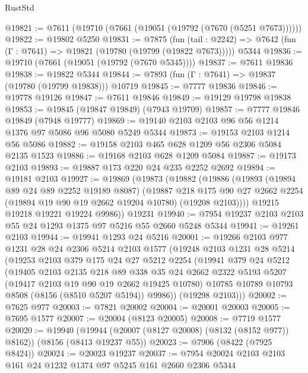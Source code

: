 \begin{lexlean}{RustStd}
\begin{coremodule}
{\begin{coremodule}
{{{{{{{{{{{{{{{{{{{{{{{{{{{{{{{{{{@19821 := @7611 (@19710 (@7661 (@19051 (@19792 (@7670 (@5251 @7673))))))
@19822 := @19802 @5250
@19831 := @7875
    (fun (tail : @2242) => @7642 (fun (Γ : @7641) => @19821 (@19780 (@19799 (@19822 @7673)))))
    @5344
@19836 := @19710 (@7661 (@19051 (@19792 (@7670 @5345))))
@19837 := @7611 @19836
@19838 := @19822 @5344
@19844 := @7893 (fun (Γ : @7641) => @19837 (@19780 (@19799 @19838))) @10719
@19845 := @7777 @19836
@19846 := @19778 @19126
@19847 := @7611 @19846
@19849 := @19129 @19798 @19838
@19853 := @19845 (@19847 @19849) (@7943 @19709)
@19857 := @7777 @19846 @19849 (@7948 @19777)
@19869 := @19140 @2103 @2103 @96 @56 @1214 @1376 @97 @5086 @96 @5080 @5249 @5344
@19873 := @19153 @2103 @1214 @56 @5086
@19882 := @19158 @2103 @465 @628 @1209 @56 @2306 @5084 @2135 @1523
@19886 := @19168 @2103 @628 @1209 @5084
@19887 := @19173 @2103
@19893 := @19887 @173 @220 @24 @235 @2252 @2692
@19894 := @19181 @2103
@19927 := @19869
    (@19873
      (@19882
        (@19886
          (@19893
            (@19894 @89 @24 @89 @2252 @19189 @8087)
            (@19887
              @218
              @175
              @90
              @27
              @2662
              @2254
              (@19894 @19 @90 @19 @2662 @19204 @10780)
              (@19208 @2103))))
        @19215
        @19218
        @19221
        @19224
        @9986))
    @19231
@19940 := @7954 @19237 @2103 @2103 @55 @24 @1293 @1375 @97 @5216 @55 @2660 @5248 @5344
@19941 := @19261 @2103
@19944 := @19941 @1293 @24 @5216
@20001 := @19266
    @2103
    @977
    @1231
    @28
    @24
    @2306
    @5214
    @2103
    @1577
    (@19248
      @2103
      @1231
      @28
      @5214
      (@19253
        @2103
        @379
        @175
        @24
        @27
        @5212
        @2254
        (@19941
          @379
          @24
          @5212
          (@19405
            @2103
            @2135
            @218
            @89
            @338
            @35
            @24
            @2662
            @2322
            @5193
            @5207
            (@19417 @2103 @19 @90 @19 @2662 @19425 @10780)
            @10785
            @10789
            @10793
            @8508
            (@8156 (@8510 @5207 @5194))
            @9986))
        (@19298 @2103)))
@20002 := @7625 @977
@20003 := @7821 @20002
@20004 := @20001 @20003
@20005 := @7695 @1577
@20007 := @20004 (@8123 @20005)
@20008 := @7719 @1577
@20020 := @19940
    (@19944 (@20007 (@8127 @20008) (@8132 (@8152 @977)) @8162))
    (@8156 (@8413 @19237 @55))
@20023 := @7906 (@8422 (@7925 @8424))
@20024 := @20023 @19237
@20037 := @7954 @20024 @2103 @2103 @161 @24 @1232 @1374 @97 @5245 @161 @2660 @2306 @5344
}}}}}}}}}}}}}}}}}}}}}}}}}}}}}}}}}}
\end{coremodule}}
\end{coremodule}
\end{lexlean}
